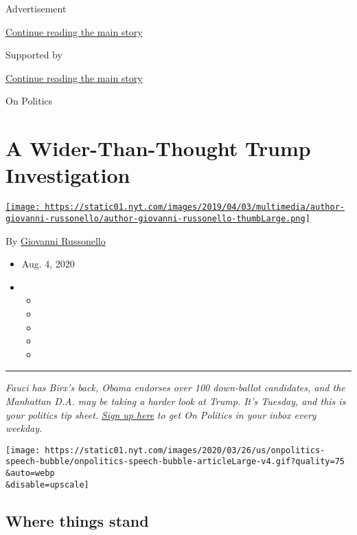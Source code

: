 Advertisement

\protect\hyperlink{after-top}{Continue reading the main story}

Supported by

\protect\hyperlink{after-sponsor}{Continue reading the main story}

On Politics

\hypertarget{a-wider-than-thought-trump-investigation}{%
\section{A Wider-Than-Thought Trump
Investigation}\label{a-wider-than-thought-trump-investigation}}

\href{https://www.nytimes.com/by/giovanni-russonello}{\texttt{[image: https://static01.nyt.com/images/2019/04/03/multimedia/author-giovanni-russonello/author-giovanni-russonello-thumbLarge.png]}}

By \href{https://www.nytimes.com/by/giovanni-russonello}{Giovanni
Russonello}

\begin{itemize}
\item
  Aug. 4, 2020
\item
  \begin{itemize}
  \item
  \item
  \item
  \item
  \item
  \end{itemize}
\end{itemize}

\begin{center}\rule{0.5\linewidth}{\linethickness}\end{center}

\emph{Fauci has Birx's back, Obama endorses over 100 down-ballot
candidates, and the Manhattan D.A. may be taking a harder look at Trump.
It's Tuesday, and this is your politics tip sheet.}
\href{https://www.nytimes.com/newsletters/politics?module=inline}{\emph{Sign
up here}} \emph{to get On Politics in your inbox every weekday.}

\texttt{[image: https://static01.nyt.com/images/2020/03/26/us/onpolitics-speech-bubble/onpolitics-speech-bubble-articleLarge-v4.gif?quality=75\\\&auto=webp\\\&disable=upscale]}

\hypertarget{where-things-stand}{%
\subsection{Where things stand}\label{where-things-stand}}

